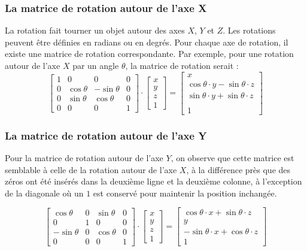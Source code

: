 \subsubsection*{La matrice de rotation autour de l'axe X}
La rotation fait tourner un objet autour des axes $X$, $Y$ et $Z$. Les rotations peuvent être définies en radians ou en degrés. Pour chaque axe de rotation, il existe une matrice de rotation correspondante. Par exemple, pour une rotation autour de l'axe $X$ par un angle $\theta$, la matrice de rotation serait :
\[
\begin{bmatrix}
1 & 0 & 0 & 0\\
0 & \cos{\theta} & -\sin{\theta} & 0\\
0 & \sin{\theta} & \cos{\theta} & 0\\
0 & 0 & 0 & 1
\end{bmatrix}
\cdot
\begin{bmatrix}
x\\
y\\
z\\
1
\end{bmatrix}
=
\begin{bmatrix}
x\\
\cos{\theta} \cdot y - \sin{\theta} \cdot z\\
\sin{\theta} \cdot y + \sin{\theta} \cdot z\\\\
1
\end{bmatrix}
\]

\subsubsection*{La matrice de rotation autour de l'axe Y}
Pour la matrice de rotation autour de l'axe $Y$, on observe que cette matrice est semblable à celle de la rotation autour de l'axe $X$, à la différence près que des zéros ont été insérés dans la deuxième ligne et la deuxième colonne, à l'exception de la diagonale où un $1$ est conservé pour maintenir la position inchangée.

\[
\begin{bmatrix}
\cos{\theta} & 0 & \sin{\theta} & 0\\
0 & 1 & 0 & 0\\
-\sin{\theta} & 0 & \cos{\theta} & 0\\
0 & 0 & 0 & 1
\end{bmatrix}
\cdot
\begin{bmatrix}
x\\
y\\
z\\
1
\end{bmatrix}
=
\begin{bmatrix}

\cos{\theta} \cdot x + \sin{\theta} \cdot z\\
y\\
-\sin{\theta} \cdot x + \cos{\theta} \cdot z\\
1
\end{bmatrix}
\]

